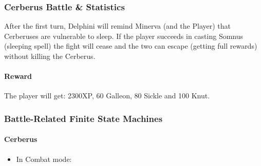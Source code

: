 \subsubsection{Cerberus Battle \& Statistics}

After the first turn, Delphini will remind Minerva (and the Player) that Cerberuses are vulnerable to sleep. If the player succeeds in casting Somnus (sleeping spell) the fight will cease and the two can escape (getting full rewards) without killing the Cerberus.

\paragraph{Reward} The player will get: 2300XP, 60 Galleon, 80 Sickle and 100 Knut.

\subsubsection{Battle-Related Finite State Machines}

\paragraph{Cerberus}
\begin{itemize}
\item In Combat mode: 
\end{itemize}
\pagebreak

